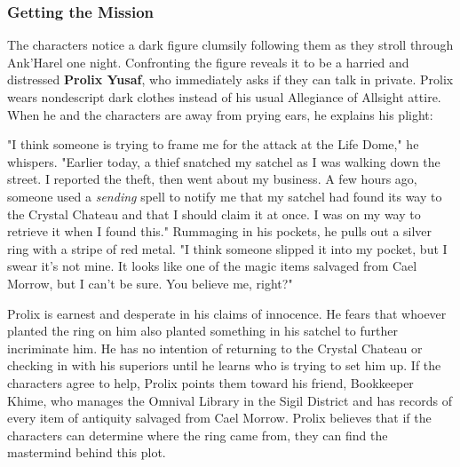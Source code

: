 \documentclass[10pt,a4,twoside,twocolumn,openany,nodeprecatedcode]{dndbook}
\begin{document}
\subsubsection{Getting the Mission}
The characters notice a dark figure clumsily following them as they stroll through Ank'Harel one night. Confronting the figure reveals it to be a harried and distressed \textbf{Prolix Yusaf}, who immediately asks if they can talk in private.
Prolix wears nondescript dark clothes instead of his usual Allegiance of Allsight attire. When he and the characters are away from prying ears, he explains his plight:
\begin{DndReadAloud}{}
"I think someone is trying to frame me for the attack at the Life Dome," he whispers.
"Earlier today, a thief snatched my satchel as I was walking down the street. I reported the theft, then went about my business. A few hours ago, someone used a \textit{sending} spell to notify me that my satchel had found its way to the Crystal Chateau and that I should claim it at once. I was on my way to retrieve it when I found this."
Rummaging in his pockets, he pulls out a silver ring with a stripe of red metal. "I think someone slipped it into my pocket, but I swear it's not mine. It looks like one of the magic items salvaged from Cael Morrow, but I can't be sure. You believe me, right?"
\end{DndReadAloud}

Prolix is earnest and desperate in his claims of innocence. He fears that whoever planted the ring on him also planted something in his satchel to further incriminate him. He has no intention of returning to the Crystal Chateau or checking in with his superiors until he learns who is trying to set him up.
If the characters agree to help, Prolix points them toward his friend, Bookkeeper Khime, who manages the Omnival Library in the Sigil District and has records of every item of antiquity salvaged from Cael Morrow. Prolix believes that if the characters can determine where the ring came from, they can find the mastermind behind this plot.
\end{document}
